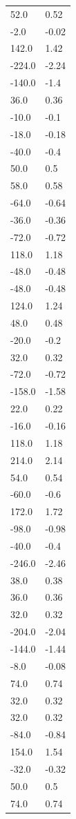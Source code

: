 \begin{longtable}{ll}
52.0 & 0.52 \\
-2.0 & -0.02 \\
142.0 & 1.42 \\
-224.0 & -2.24 \\
-140.0 & -1.4 \\
36.0 & 0.36 \\
-10.0 & -0.1 \\
-18.0 & -0.18 \\
-40.0 & -0.4 \\
50.0 & 0.5 \\
58.0 & 0.58 \\
-64.0 & -0.64 \\
-36.0 & -0.36 \\
-72.0 & -0.72 \\
118.0 & 1.18 \\
-48.0 & -0.48 \\
-48.0 & -0.48 \\
124.0 & 1.24 \\
48.0 & 0.48 \\
-20.0 & -0.2 \\
32.0 & 0.32 \\
-72.0 & -0.72 \\
-158.0 & -1.58 \\
22.0 & 0.22 \\
-16.0 & -0.16 \\
118.0 & 1.18 \\
214.0 & 2.14 \\
54.0 & 0.54 \\
-60.0 & -0.6 \\
172.0 & 1.72 \\
-98.0 & -0.98 \\
-40.0 & -0.4 \\
-246.0 & -2.46 \\
38.0 & 0.38 \\
36.0 & 0.36 \\
32.0 & 0.32 \\
-204.0 & -2.04 \\
-144.0 & -1.44 \\
-8.0 & -0.08 \\
74.0 & 0.74 \\
32.0 & 0.32 \\
32.0 & 0.32 \\
-84.0 & -0.84 \\
154.0 & 1.54 \\
-32.0 & -0.32 \\
50.0 & 0.5 \\
74.0 & 0.74 \\

\end{longtable}
